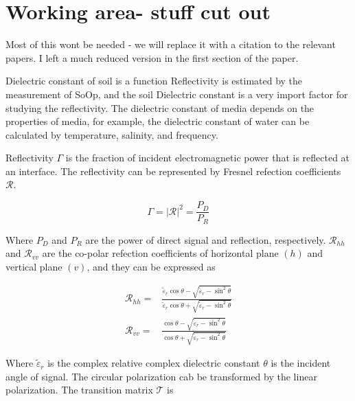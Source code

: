 \documentclass[draftcls,onecolumn]{IEEEtran}  %
\begin{document}
\section{Working area- stuff cut out}

Most of this wont be needed - we will replace it with a citation to the relevant papers. I left a much reduced version in the first section of the paper. 

Dielectric constant of soil is a function Reflectivity is estimated by the measurement of SoOp, and the soil Dielectric constant is a very import factor for studying the reflectivity. The dielectric constant of media depends on the properties of media, for example, the dielectric constant of water can be calculated by temperature, salinity, and frequency.


Reflectivity $\Gamma$ is the fraction of incident electromagnetic power that is reflected at an interface. The reflectivity can be represented by Fresnel refection coefficients $\mathcal{R}$.

\begin{equation}
\Gamma = |\mathcal{R}|^2=\frac{P_D}{P_R}
\end{equation}

Where $P_D$ and $P_R$ are the power of direct signal and reflection, respectively. $\mathcal{R}_{hh}$ and $\mathcal{R}_{vv}$ are the co-polar refection coefficients of horizontal plane $(h)$ and vertical plane $(v)$, and they can be expressed as

\begin{equation} 
\begin{split}
	{\mathcal{R}_{hh}} = {}& \frac{{{{\tilde \varepsilon }_r}\cos \theta  - \sqrt 				{{{\tilde \varepsilon }_r} - {{\sin }^2}\theta } }}{{{{\tilde \varepsilon}_r}				\cos \theta  + \sqrt {{{\tilde \varepsilon }_r} - {{\sin }^2}\theta }}}
\\
	{\mathcal{R}_{vv}} = {}& \frac{{\cos \theta  - \sqrt {{{\tilde \varepsilon }_r} - {{\sin }^2}\theta } }}{{\cos \theta  + \sqrt {{{\tilde \varepsilon }_r} - {{\sin }^2}\theta }}} 
    \end{split}
     \label{Eq: reflectivity_di}
\end{equation}

Where $\tilde{\varepsilon}_r$ is the complex relative complex dielectric constant  $\theta$ is the incident angle of signal. The circular polarization cab be transformed by the linear polarization. The transition matrix $\mathcal{T}$ is
\end{document}
